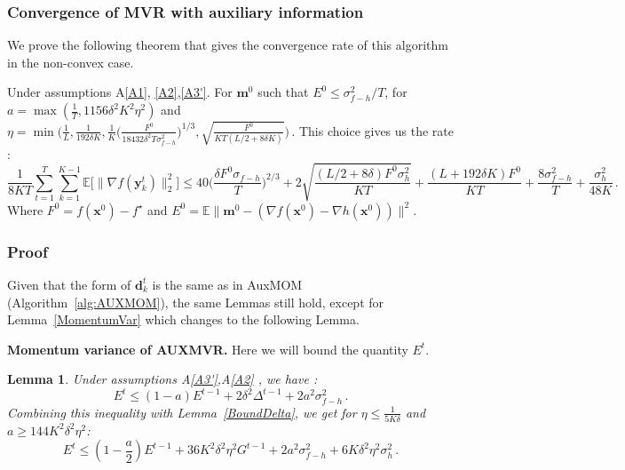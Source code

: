 \documentclass[10pt]{article} %
\theoremstyle{plain}
\newtheorem{lemma}[theorem]{Lemma}
\theoremstyle{definition}
\theoremstyle{remark}
\newcommand{\norm}[1]{\|#1\|_2}
\def\vd{{\bm{d}}}
\def\vm{{\bm{m}}}
\def\vx{{\bm{x}}}
\def\vy{{\bm{y}}}
\newcommand{\E}{\mathbb{E}}
\begin{document}
\subsubsection{Convergence of MVR with auxiliary information}
We prove the following theorem that gives the convergence rate of this algorithm in the non-convex case.
\begin{framedtheorem}
Under assumptions A\ref{A1}, \ref{A2},\ref{A3'}. For $\vm^0$ such that $E^0\leq \sigma_{f-h}^2/T$, for $a =\max(\frac{1}{T}, 1156 \delta^2 K^2\eta^2)$  and 
$\eta = \min\Big(\frac{1}{L},\frac{1}{192\delta K}, \frac{1}{K}\Big(\frac{F^0}{18432\delta^2T\sigma_{f-h}^2}\Big)^{1/3},\sqrt{\frac{F^0}{KT(L/2 + 8\delta K)}}\Big)\, .$
This choice gives us the rate :
$$\frac{1}{8KT}\sum_{t=1}^T\sum_{k=1}^{K-1} \E\big[\norm{\nabla f(\vy^t_{k})}^2\big] \leq 40 \Big(\frac{\delta F^0\sigma_{f-h}}{T}\Big)^{2/3} + 2\sqrt{\frac{(L/2 + 8\delta )F^0\sigma_{h}^2}{KT}} +  \frac{(L + 192 \delta K)F^0}{KT} + \frac{8\sigma_{f-h}^2}{T} + \frac{\sigma_h^2}{48 K}\, .$$
Where $F^0 = f(\vx^0) - f^\star$ and $E^0 = \E\|\vm^0 - (\nabla f(\vx^0) - \nabla h(\vx^0))\|^2$.
\end{framedtheorem}


\subsubsection{Proof}

Given that the form of $\vd^t_k$ is the same as in AuxMOM (Algorithm~\ref{alg:AUXMOM}), the same Lemmas still hold, except for Lemma~\ref{MomentumVar} which changes to the following Lemma.

\textbf{Momentum variance of AUXMVR.} Here we will bound the quantity $E^t$.

\begin{lemma}\label{VarMomAUXMVR}
Under assumptions A\ref{A3'},A\ref{A2} , we have : $$E^t \leq (1 - a)E^{t-1} + 2\delta^2\Delta^{t-1} + 2 a^2 \sigma_{f-h}^2\, .$$
Combining this inequality with Lemma~\ref{BoundDelta}, we get for $\eta\leq \frac{1}{5K\delta}$ and $a\geq 144 K^2\delta^2\eta^2$:
$$E^t \leq (1 - \frac{a}{2})E^{t-1} + 36 K^2\delta^2\eta^2 G^{t-1} + 2 a^2 \sigma_{f-h}^2 + 6K\delta^2\eta^2\sigma_h^2\, .$$

\end{lemma}
\end{document}
